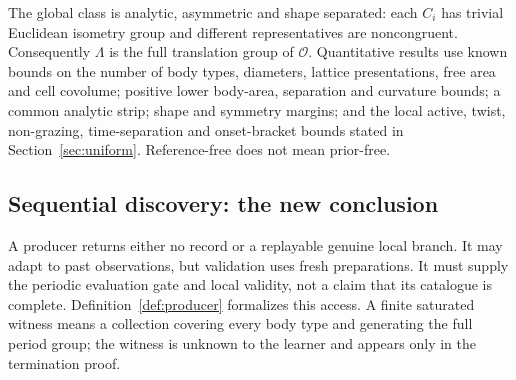 The global class is analytic, asymmetric and shape separated: each $C_i$
has trivial Euclidean isometry group and different representatives are
noncongruent. Consequently $\Lambda$ is the full translation group of
$\mathcal O$. Quantitative results use known bounds on the number of
body types, diameters, lattice presentations, free area and cell covolume;
positive lower body-area, separation and curvature bounds; a common
analytic strip; shape and symmetry margins; and the local active, twist,
non-grazing, time-separation and onset-bracket bounds stated in
Section~\ref{sec:uniform}. Reference-free does not mean prior-free.

\subsection{Sequential discovery: the new conclusion}
A producer returns either no record or a replayable genuine local branch.
It may adapt to past observations, but validation uses fresh preparations.
It must supply the periodic evaluation gate and local validity, not a
claim that its catalogue is complete. Definition~\ref{def:producer}
formalizes this access. A finite saturated witness means a collection
covering every body type and generating the full period group; the witness
is unknown to the learner and appears only in the termination proof.

